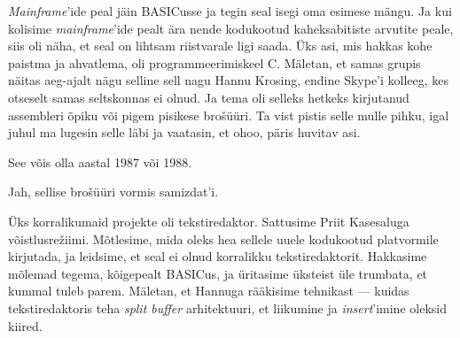 
\emph{Mainframe}'ide peal jäin BASICusse ja tegin seal isegi 
oma esimese mängu. Ja kui kolisime \emph{mainframe}'ide pealt ära nende 
kodukootud kaheksabitiste arvutite peale, siis oli näha, et seal on lihtsam 
riistvarale ligi saada. Üks asi, mis hakkas kohe paistma ja ahvatlema, 
oli programmeerimiskeel C. Mäletan, et samas grupis näitas aeg-ajalt 
nägu selline sell nagu Hannu Krosing, 
endine Skype'i kolleeg, kes otseselt samas seltskonnas ei olnud. Ja tema oli 
selleks hetkeks kirjutanud assembleri õpiku või pigem pisikese 
brošüüri. Ta vist pistis selle mulle pihku,
igal juhul ma lugesin selle läbi ja vaatasin, et ohoo, päris 
huvitav asi. 


See võis olla aastal 1987 või 1988.


Jah, sellise brošüüri vormis 
samizdat'i. 


Üks korralikumaid projekte oli tekstiredaktor\label{sisu!jaani_tekstiredaktor}. 
Sattusime Priit Kasesaluga 
võistlusrežiimi. Mõtlesime, mida oleks hea sellele uuele kodukootud 
platvormile kirjutada, ja leidsime, et seal ei olnud korralikku tekstiredaktorit. 
Hakkasime mõlemad tegema, kõigepealt BASICus, ja üritasime 
üksteist üle trumbata, et kummal tuleb parem. Mäletan, et 
Hannuga rääkisime tehnikast --- kuidas 
tekstiredaktoris teha \emph{split buffer} arhitektuuri, et 
liikumine ja \emph{insert}'imine oleksid kiired.

